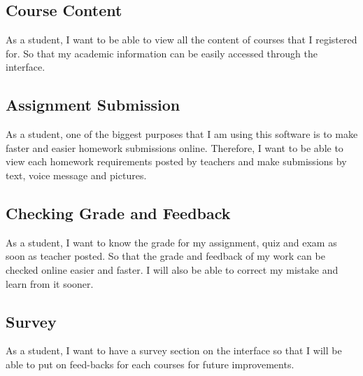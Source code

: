 \subsection{Course Content}
As a student, I want to be able to view all the content of courses that I registered for. So that my academic information can be easily accessed through the interface. 

\subsection{Assignment Submission}
As a student, one of the biggest purposes that I am using this software is to make faster and easier homework submissions online. Therefore, I want to be able to view each homework requirements posted by teachers and make submissions by text, voice message and pictures. 

\subsection{Checking Grade and Feedback}
As a student, I want to know the grade for my assignment, quiz and exam as soon as teacher posted. So that the grade and feedback of my work can be checked online easier and faster. I will also be able to correct my mistake and learn from it sooner. 

\subsection{Survey}
As a student, I want to have a survey section on the interface so that I will be able to put on feed-backs for each courses for future improvements. 
